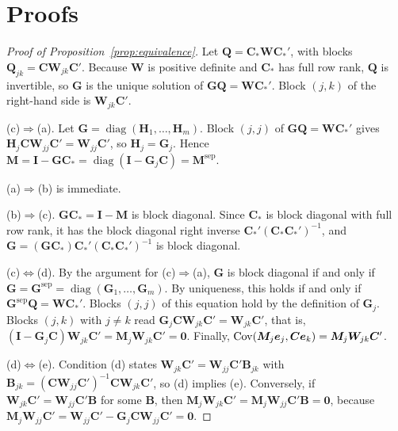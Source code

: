 
\section{Proofs}
\label{app:proofs}

\begin{proof}[Proof of Proposition~\ref{prop:equivalence}]
Let $\bm{Q} = \bm{C}_*\bm{W}\bm{C}_*'$, with blocks $\bm{Q}_{jk} = \bm{C}\bm{W}_{jk}\bm{C}'$. Because $\bm{W}$ is positive definite and $\bm{C}_*$ has full row rank, $\bm{Q}$ is invertible, so $\bm{G}$ is the unique solution of $\bm{G}\bm{Q} = \bm{W}\bm{C}_*'$. Block $(j,k)$ of the right-hand side is $\bm{W}_{jk}\bm{C}'$.

(c)$\Rightarrow$(a). Let $\bm{G} = \operatorname{diag}(\bm{H}_1, \dots, \bm{H}_m)$. Block $(j,j)$ of $\bm{G}\bm{Q} = \bm{W}\bm{C}_*'$ gives $\bm{H}_j\bm{C}\bm{W}_{jj}\bm{C}' = \bm{W}_{jj}\bm{C}'$, so $\bm{H}_j = \bm{G}_j$. Hence $\bm{M} = \bm{I} - \bm{G}\bm{C}_* = \operatorname{diag}(\bm{I} - \bm{G}_j\bm{C}) = \bm{M}^{\mathrm{sep}}$.

(a)$\Rightarrow$(b) is immediate.

(b)$\Rightarrow$(c). $\bm{G}\bm{C}_* = \bm{I} - \bm{M}$ is block diagonal. Since $\bm{C}_*$ is block diagonal with full row rank, it has the block diagonal right inverse $\bm{C}_*'(\bm{C}_*\bm{C}_*')^{-1}$, and $\bm{G} = (\bm{G}\bm{C}_*)\bm{C}_*'(\bm{C}_*\bm{C}_*')^{-1}$ is block diagonal.

(c)$\Leftrightarrow$(d). By the argument for (c)$\Rightarrow$(a), $\bm{G}$ is block diagonal if and only if $\bm{G} = \bm{G}^{\mathrm{sep}} = \operatorname{diag}(\bm{G}_1, \dots, \bm{G}_m)$. By uniqueness, this holds if and only if $\bm{G}^{\mathrm{sep}}\bm{Q} = \bm{W}\bm{C}_*'$. Blocks $(j,j)$ of this equation hold by the definition of $\bm{G}_j$. Blocks $(j,k)$ with $j \ne k$ read $\bm{G}_j\bm{C}\bm{W}_{jk}\bm{C}' = \bm{W}_{jk}\bm{C}'$, that is, $(\bm{I} - \bm{G}_j\bm{C})\bm{W}_{jk}\bm{C}' = \bm{M}_j\bm{W}_{jk}\bm{C}' = \bm{0}$. Finally, $\operatorname{Cov}(\bm{M}_j\bm{e}_j, \bm{C}\bm{e}_k) = \bm{M}_j\bm{W}_{jk}\bm{C}'$.

(d)$\Leftrightarrow$(e). Condition (d) states $\bm{W}_{jk}\bm{C}' = \bm{W}_{jj}\bm{C}'\bm{B}_{jk}$ with $\bm{B}_{jk} = (\bm{C}\bm{W}_{jj}\bm{C}')^{-1}\bm{C}\bm{W}_{jk}\bm{C}'$, so (d) implies (e). Conversely, if $\bm{W}_{jk}\bm{C}' = \bm{W}_{jj}\bm{C}'\bm{B}$ for some $\bm{B}$, then $\bm{M}_j\bm{W}_{jk}\bm{C}' = \bm{M}_j\bm{W}_{jj}\bm{C}'\bm{B} = \bm{0}$, because $\bm{M}_j\bm{W}_{jj}\bm{C}' = \bm{W}_{jj}\bm{C}' - \bm{G}_j\bm{C}\bm{W}_{jj}\bm{C}' = \bm{0}$.
\end{proof}

